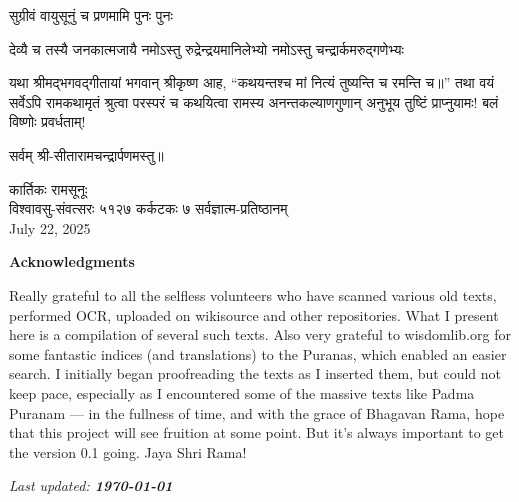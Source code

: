 {सुग्रीवं वायुसूनुं च प्रणमामि पुनः पुनः}

{देव्यै च तस्यै जनकात्मजायै}
{नमोऽस्तु रुद्रेन्द्रयमानिलेभ्यो}
{नमोऽस्तु चन्द्रार्कमरुद्गणेभ्यः}

यथा श्रीमद्भगवद्\-गीतायां भगवान् श्रीकृष्ण आह, ``कथयन्तश्च मां नित्यं तुष्यन्ति च रमन्ति च॥'' तथा वयं सर्वेऽपि रामकथामृतं श्रुत्वा परस्परं च कथयित्वा रामस्य अनन्तकल्याणगुणान् अनुभूय तुष्टिं प्राप्नुयामः! बलं विष्णोः प्रवर्धताम्!\\



\centerline{सर्वम् श्री-सीतारामचन्द्रार्पणमस्तु॥}
\endgroup
\medskip
{} \hfill कार्तिकः रामसूनूः\\
विश्वावसु-संवत्सरः ५१२७ कर्कटकः ७ \hfill सर्वज्ञात्म-प्रतिष्ठानम्\\
July 22, 2025


\vfill

\centerline{\large \textbf{Acknowledgments}}

\textsf{\scriptsize Really grateful to all the selfless volunteers who have scanned various old texts, performed OCR, uploaded on wikisource and other repositories. What I present here is a compilation of several such texts. Also very grateful to wisdomlib.org for some fantastic indices (and translations) to the Puranas, which enabled an easier search. %
 I initially began proofreading the texts as I inserted them, but could not keep pace, especially as I encountered some of the massive texts like Padma Puranam --- in the fullness of time, and with the grace of Bhagavan Rama, hope that this project will see fruition at some point. But it's always important to get the version 0.1 going. Jaya Shri Rama!}

\bigskip

\centerline{\textit{\scriptsize Last updated: \textbf{\today}}}